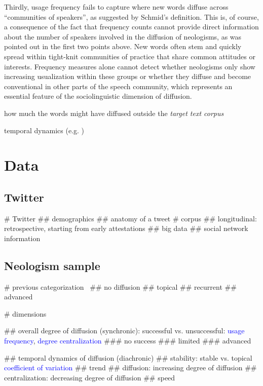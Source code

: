 \documentclass[a4paper]{scrartcl}
\newcommand{\mtrc}[1]{\textcolor{blue}{#1}}
\begin{document}
    Thirdly, usage frequency fails to capture where new words diffuse across \enquote{communities of speakers}, as suggested by Schmid's definition. This is, of course, a consequence of the fact that frequency counts cannot provide direct information about the number of speakers involved in the diffusion of neologisms, as was pointed out in the first two points above. New words often stem and quickly spread within tight-knit communities of practice that share common attitudes or interests. Frequency measures alone cannot detect whether neologisms only show increasing usualization within these groups or whether they diffuse and become conventional in other parts of the speech community, which represents an essential feature of the sociolinguistic dimension of diffusion.


    how much the words might have diffused outside the \emph{target text corpus}

    temporal dynamics (e.g. )

\section{Data}

  \subsection{Twitter}

    \begin{easylist}[itemize]
      # Twitter
        ## demographics
        ## anatomy of a tweet
      # corpus
        ## longitudinal: retrospective, starting from early attestations
        ## big data
        ## social network information
    \end{easylist}

  \subsection{Neologism sample}


      \begin{easylist}[itemize]

        # previous categorization~\parencite{Kerremans2015}
          ## no diffusion
          ## topical
          ## recurrent
          ## advanced

        # dimensions

          ## overall degree of diffusion (synchronic): successful vs. unsuccessful: \mtrc{usage frequency}, \mtrc{degree centralization}
            ### no success
            ### limited
            ### advanced

          ## temporal dynamics of diffusion (diachronic)
            ## stability: stable vs. topical \mtrc{coefficient of variation}
            ## trend
              ## diffusion: increasing degree of diffusion
              ## centralization: decreasing degree of diffusion
            ## speed

      \end{easylist}
\end{document}
